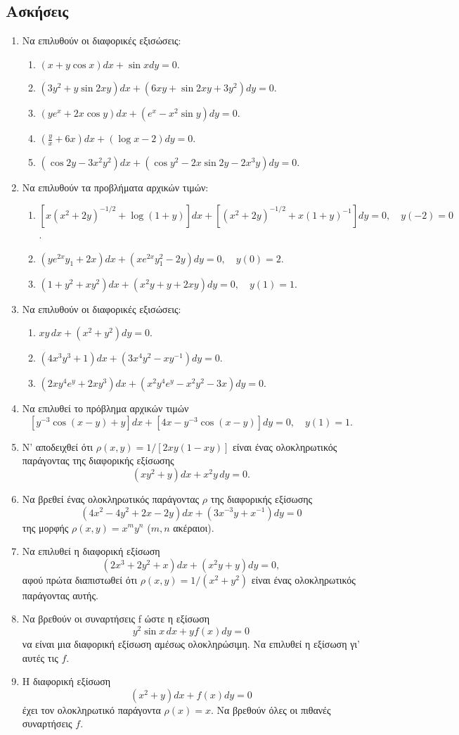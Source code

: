 \documentclass[11pt,a4paper,twoside]{book}
\begin{document}
\subsection{Ασκήσεις}
\begin{enumerate}
\item Να επιλυθούν οι διαφορικές εξισώσεις:
\begin{enumerate}[label=(\roman*)]
\item $(x+y\cos x)dx+\sin x dy=0$.
\item $(3y^2+y\sin 2xy)dx+(6xy+\sin 2xy+3y^2)dy=0$.
\item $(ye^x+2x\cos y)dx+(e^x-x^2\sin y)dy=0$.
\item $(\frac{y}{x}+6x)dx+(\log x-2)dy=0$.
\item $(\cos 2y-3x^2y^2)dx+(\cos y^2-2x\sin 2y-2x^3y)dy=0$.
\end{enumerate}
\item Να επιλυθούν τα προβλήματα αρχικών τιμών:
\begin{enumerate}[label=(\roman*)]
\item $[x(x^2+2y)^{-1/2}+\log(1+y)]dx+[(x^2+2y)^{-1/2}+x(1+y)^{-1}]dy=0, \quad y(-2)=0$.
\item $(ye^{2x}y_1+2x)dx+(xe^{2x}y_1^2-2y)dy=0, \quad y(0)=2.$
\item $(1+y^2+xy^2)dx+(x^2y+y+2xy)dy=0, \quad y(1)=1.$
\end{enumerate}
\item Να επιλυθούν οι διαφορικές εξισώσεις:
\begin{enumerate}[label=(\roman*)]
\item $xy\,dx+(x^2+y^2)dy=0.$
\item $(4x^3y^3+1)dx+(3x^4y^2-xy^{-1})dy=0.$
\item $(2xy^4e^y+2xy^3)dx+(x^2y^4e^y-x^2y^2-3x)dy=0.$
\end{enumerate}
\item Να επιλυθεί το πρόβλημα αρχικών τιμών
\[
[y^{-3}\cos(x-y)+y]dx+[4x-y^{-3}\cos(x-y)]dy=0, \quad y(1)=1.
\]
\item Ν' αποδειχθεί ότι $\rho(x,y)=1/[2xy(1-xy)]$ είναι ένας ολοκληρωτικός παράγοντας της διαφορικής εξίσωσης
\[
(xy^2+y)dx+x^2y\,dy=0.
\]
\item Να βρεθεί ένας ολοκληρωτικός παράγοντας $\rho$ της διαφορικής εξίσωσης
\[
(4x^2-4y^2+2x-2y)dx+(3x^{-3}y+x^{-1})dy=0
\]
της μορφής $\rho(x,y)=x^m y^n$ ($m,n$ ακέραιοι).
\item Να επιλυθεί η διαφορική εξίσωση
\[
(2x^3+2y^2+x)dx+(x^2y+y)dy=0,
\]
αφού πρώτα διαπιστωθεί ότι $\rho(x,y)=1/(x^2+y^2)$ είναι ένας ολοκληρωτικός παράγοντας αυτής.
\item Να βρεθούν οι συναρτήσεις f ώστε η εξίσωση
\[
y^2\sin x\,dx+yf(x)dy=0
\]
να είναι μια διαφορική εξίσωση αμέσως ολοκληρώσιμη. Να επιλυθεί η εξίσωση γι' αυτές τις $f$.
\item Η διαφορική εξίσωση
\[
(x^2+y)dx+f(x)dy=0
\]
έχει τον ολοκληρωτικό παράγοντα $\rho(x)=x$. Να βρεθούν όλες οι πιθανές συναρτήσεις $f$.
\end{enumerate}
\end{document}
